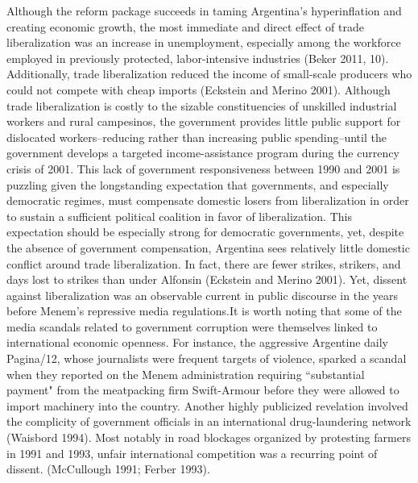 \documentclass[a4paper]{article}\usepackage[]{graphicx}\usepackage[]{color}
\begin{document}
Although the reform package succeeds in taming Argentina's hyperinflation and creating economic growth, the most immediate and direct effect of trade liberalization was an increase in unemployment, especially among the workforce employed in previously protected, labor-intensive industries (Beker 2011, 10). Additionally, trade liberalization reduced the income of small-scale producers who could not compete with cheap imports (Eckstein and Merino 2001). Although trade liberalization is costly to the sizable constituencies of unskilled industrial workers and rural campesinos, the government provides little public support for dislocated workers--reducing rather than increasing public spending--until the government develops a targeted income-assistance program during the currency crisis of 2001. This lack of government responsiveness between 1990 and 2001 is puzzling given the longstanding expectation that governments, and especially democratic regimes, must compensate domestic losers from liberalization in order to sustain a sufficient political coalition in favor of liberalization. This expectation should be especially strong for democratic governments, yet, despite the absence of government compensation, Argentina sees relatively little domestic conflict around trade liberalization. In fact, there are fewer strikes, strikers, and days lost to strikes than under Alfonsin (Eckstein and Merino 2001). Yet, dissent against liberalization was an observable current in public discourse in the years before Menem's repressive media regulations.It is worth noting that some of the media scandals related to government corruption were themselves linked to international economic openness. For instance, the aggressive Argentine daily Pagina/12, whose journalists were frequent targets of violence, sparked a scandal when they reported on the Menem administration requiring ``substantial payment" from the meatpacking firm Swift-Armour before they were allowed to import machinery into the country. Another highly publicized revelation involved the complicity of government officials in an international drug-laundering network (Waisbord 1994). Most notably in road blockages organized by protesting farmers in 1991 and 1993, unfair international competition was a recurring point of dissent. (McCullough 1991; Ferber 1993).
\end{document}
